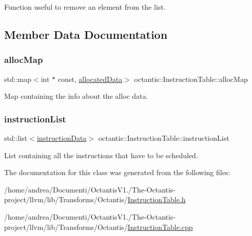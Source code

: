 Function useful to remove an element from the list. 



\subsection{Member Data Documentation}
\mbox{\label{classoctantis_1_1InstructionTable_a3a31a38f9f92b0ecd72c63698fe02808}} 
\subsubsection{\texorpdfstring{alloc\+Map}{allocMap}}
{\footnotesize\ttfamily std\+::map$<$int $\ast$ const, \hyperlink{structoctantis_1_1InstructionTable_1_1allocatedData}{allocated\+Data}$>$ octantis\+::\+Instruction\+Table\+::alloc\+Map}



Map containing the info about the alloc data. 

\mbox{\label{classoctantis_1_1InstructionTable_a3b03228ed9a4db4430563ff61fcc6c6e}} 
\subsubsection{\texorpdfstring{instruction\+List}{instructionList}}
{\footnotesize\ttfamily std\+::list$<$\hyperlink{structoctantis_1_1InstructionTable_1_1instructionData}{instruction\+Data}$>$ octantis\+::\+Instruction\+Table\+::instruction\+List}



List containing all the instructions that have to be scheduled. 



The documentation for this class was generated from the following files\+:\begin{DoxyCompactItemize}
\item 
/home/andrea/\+Documenti/\+Octantis\+V1./\+The-\/\+Octantis-\/project/llvm/lib/\+Transforms/\+Octantis/\hyperlink{InstructionTable_8h}{Instruction\+Table.\+h}\item 
/home/andrea/\+Documenti/\+Octantis\+V1./\+The-\/\+Octantis-\/project/llvm/lib/\+Transforms/\+Octantis/\hyperlink{InstructionTable_8cpp}{Instruction\+Table.\+cpp}\end{DoxyCompactItemize}
